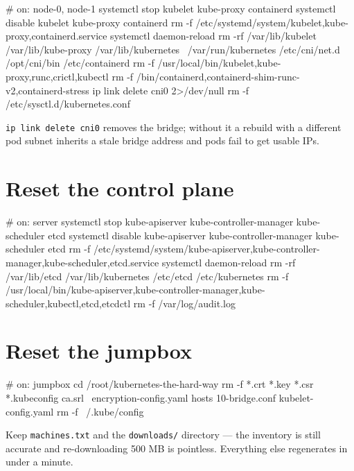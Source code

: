 \documentclass[11pt,oneside]{report}
\begin{document}
\begin{cmdlst}
# on: node-0, node-1
{
  systemctl stop kubelet kube-proxy containerd
  systemctl disable kubelet kube-proxy containerd
  rm -f /etc/systemd/system/{kubelet,kube-proxy,containerd}.service
  systemctl daemon-reload
  rm -rf /var/lib/kubelet /var/lib/kube-proxy /var/lib/kubernetes \
         /var/run/kubernetes /etc/cni/net.d /opt/cni/bin /etc/containerd
  rm -f /usr/local/bin/{kubelet,kube-proxy,runc,crictl,kubectl}
  rm -f /bin/{containerd,containerd-shim-runc-v2,containerd-stress}
  ip link delete cni0 2>/dev/null
  rm -f /etc/sysctl.d/kubernetes.conf
}
\end{cmdlst}

\texttt{ip\ link\ delete\ cni0}
removes the bridge;
without it a rebuild
with a different pod
subnet inherits a
stale bridge address
and pods fail to get
usable IPs.

\hypertarget{reset-the-control-plane}{%
\section{Reset the
control
plane}\label{reset-the-control-plane}}

\begin{cmdlst}
# on: server
{
  systemctl stop kube-apiserver kube-controller-manager kube-scheduler etcd
  systemctl disable kube-apiserver kube-controller-manager kube-scheduler etcd
  rm -f /etc/systemd/system/{kube-apiserver,kube-controller-manager,kube-scheduler,etcd}.service
  systemctl daemon-reload
  rm -rf /var/lib/etcd /var/lib/kubernetes /etc/etcd /etc/kubernetes
  rm -f /usr/local/bin/{kube-apiserver,kube-controller-manager,kube-scheduler,kubectl,etcd,etcdctl}
  rm -f /var/log/audit.log
}
\end{cmdlst}

\hypertarget{reset-the-jumpbox}{%
\section{Reset the
jumpbox}\label{reset-the-jumpbox}}

\begin{cmdlst}
# on: jumpbox
{
  cd /root/kubernetes-the-hard-way
  rm -f *.crt *.key *.csr *.kubeconfig ca.srl \
        encryption-config.yaml hosts 10-bridge.conf kubelet-config.yaml
  rm -f ~/.kube/config
}
\end{cmdlst}

Keep
\texttt{machines.txt}
and the
\texttt{downloads/}
directory --- the
inventory is still
accurate and
re-downloading 500
MB is pointless.
Everything else
regenerates in under
a minute.
\end{document}
